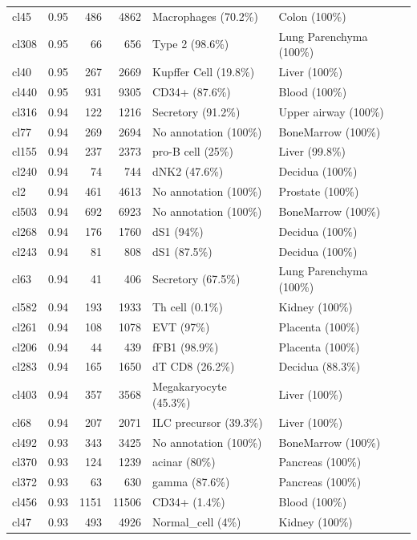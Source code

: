\begin{table}[ht!]
\begin{tabular}{lrrrll}
  cl45 & 0.95 & 486 & 4862 & Macrophages (70.2\%) & Colon (100\%) \\ 
  cl308 & 0.95 &  66 & 656 & Type 2 (98.6\%) & Lung Parenchyma (100\%) \\ 
  cl40 & 0.95 & 267 & 2669 & Kupffer Cell (19.8\%) & Liver (100\%) \\ 
  cl440 & 0.95 & 931 & 9305 & CD34+ (87.6\%) & Blood (100\%) \\ 
  cl316 & 0.94 & 122 & 1216 & Secretory (91.2\%) & Upper airway (100\%) \\ 
  cl77 & 0.94 & 269 & 2694 & No annotation (100\%) & BoneMarrow (100\%) \\ 
  cl155 & 0.94 & 237 & 2373 & pro-B cell (25\%) & Liver (99.8\%) \\ 
  cl240 & 0.94 &  74 & 744 & dNK2 (47.6\%) & Decidua (100\%) \\ 
  cl2 & 0.94 & 461 & 4613 & No annotation (100\%) & Prostate (100\%) \\ 
  cl503 & 0.94 & 692 & 6923 & No annotation (100\%) & BoneMarrow (100\%) \\ 
  cl268 & 0.94 & 176 & 1760 & dS1 (94\%) & Decidua (100\%) \\ 
  cl243 & 0.94 &  81 & 808 & dS1 (87.5\%) & Decidua (100\%) \\ 
  cl63 & 0.94 &  41 & 406 & Secretory (67.5\%) & Lung Parenchyma (100\%) \\ 
  cl582 & 0.94 & 193 & 1933 & Th cell (0.1\%) & Kidney (100\%) \\ 
  cl261 & 0.94 & 108 & 1078 & EVT (97\%) & Placenta (100\%) \\ 
  cl206 & 0.94 &  44 & 439 & fFB1 (98.9\%) & Placenta (100\%) \\ 
  cl283 & 0.94 & 165 & 1650 & dT CD8 (26.2\%) & Decidua (88.3\%) \\ 
  cl403 & 0.94 & 357 & 3568 & Megakaryocyte (45.3\%) & Liver (100\%) \\ 
  cl68 & 0.94 & 207 & 2071 & ILC precursor (39.3\%) & Liver (100\%) \\ 
  cl492 & 0.93 & 343 & 3425 & No annotation (100\%) & BoneMarrow (100\%) \\ 
  cl370 & 0.93 & 124 & 1239 & acinar (80\%) & Pancreas (100\%) \\ 
  cl372 & 0.93 &  63 & 630 & gamma (87.6\%) & Pancreas (100\%) \\ 
  cl456 & 0.93 & 1151 & 11506 & CD34+ (1.4\%) & Blood (100\%) \\ 
  cl47 & 0.93 & 493 & 4926 & Normal\_cell (4\%) & Kidney (100\%) \\ 

\end{tabular}
\end{table}
